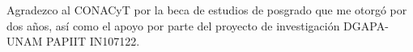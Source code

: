 
\begin{acknowledgements}


Agradezco al CONACyT  por la beca de estudios de posgrado que me otorgó por dos años, así como el apoyo por parte del proyecto de investigación DGAPA-UNAM PAPIIT IN107122.

\end{acknowledgements}




